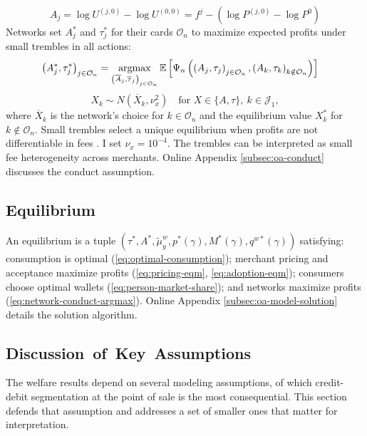 \documentclass[main.tex]{subfiles}
\begin{document}
\begin{equation}
  A_{j}=\log U^{\left(j,0\right)}-\log U^{\left(0,0\right)}=f^{j}-\left(\log P^{\left(j,0\right)}-\log P^{0}\right)\label{eq:adoption-pecuniary-gain}
\end{equation}
Networks set $A^*_{j}$ and $\tau_{j}^{*}$ for their cards $\mathcal{O}_{n}$ to maximize expected profits under small trembles in all actions:
\begin{align} 
  \left(A_{j}^{*},\tau_{j}^{*}\right)_{j\in\mathcal{O}_{n}} & =\argmax_{\left(\overline{A}_{j},\overline{\tau}_{j}\right)_{j\in\mathcal{O}_{n}}}\E\left[\Psi_{n}\left(\left(A_{j},\tau_{j}\right)_{j\in\mathcal{O}_{n}},\left(A_{k},\tau_{k}\right)_{k\notin\mathcal{O}_{n}}\right)\right]\label{eq:network-conduct-argmax}
\end{align}
\[
X_{k}\sim N\left(\overline{X}_{k},\nu_{x}^{2}\right)\quad\text{for }X\in\{A,\tau\},\ k\in\mathcal{J}_{1},
\]
where $\overline{X}_{k}$ is the network's choice for $k\in\mathcal{O}_{n}$ and the equilibrium value $X^{*}_{k}$ for $k\notin\mathcal{O}_{n}$.
Small trembles select a unique equilibrium when profits are not differentiable in fees \parencite{Teh.etal2022}.
I set $\nu_x = 10^{-4}$.
The trembles can be interpreted as small fee heterogeneity across merchants.
Online Appendix \ref{subsec:oa-conduct} discusses the conduct assumption.

\subsection{Equilibrium}
An equilibrium is a tuple $\left(\tau^{*}, A^{*}, \tilde{\mu}^w_y, p^{*}\left(\gamma\right), M^{*}\left(\gamma\right), q^{w*}\left(\gamma\right)\right)$ satisfying: consumption is optimal (\ref{eq:optimal-consumption}); merchant pricing and acceptance maximize profits (\ref{eq:pricing-eqm}, \ref{eq:adoption-eqm}); consumers choose optimal wallets (\ref{eq:person-market-share}); and networks maximize profits (\ref{eq:network-conduct-argmax}).
Online Appendix \ref{subsec:oa-model-solution} details the solution algorithm.

\subsection{Discussion~of~Key~Assumptions\label{subsec:model-assumptions}}

The welfare results depend on several modeling assumptions, of which credit-debit segmentation at the point of sale is the most consequential.
This section defends that assumption and addresses a set of smaller ones that matter for interpretation.
\end{document}
